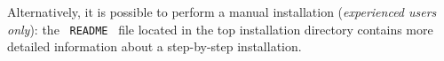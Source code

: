 Alternatively, it is possible to perform a manual installation 
({\it experienced users only}): the \ {\tt README} \ file located 
in the top installation directory contains more detailed information 
about a step-by-step installation. 

